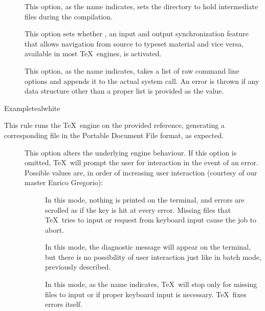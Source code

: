 \begin{description}
\begin{description}
\item[] This option, as the name indicates, sets the directory to hold intermediate files during the compilation.

\item[] This option sets whether , an input and output synchronization feature that allows navigation from source to typeset material and vice versa, available in most \TeX\ engines, is activated.

\item[] This option, as the name indicates, takes a list of raw command line options and appends it to the actual system call. An error is thrown if any data structure other than a proper list is provided as the value.
\end{description}

\begin{codebox}{Example}{teal}{\icnote}{white}
\end{codebox}

\item[\rulebox{luahbtex}]
This rule runs the  \TeX\ engine on the provided  reference, generating a corresponding file in the Portable Document File format, as expected.

\begin{description}
\item[] This option alters the underlying engine behaviour. If this option is omitted, \TeX\ will prompt the user for interaction in the event of an error. Possible values are, in order of increasing user interaction (courtesy of our master Enrico Gregorio):

\begin{description}
\item[] In this mode, nothing is printed on the terminal, and errors are scrolled as if the  key is hit at every error. Missing files that \TeX\ tries to input or request from keyboard input cause the job to abort.

\item[] In this mode, the diagnostic message will appear on the terminal, but there is no possibility of user interaction just like in batch mode, previously described.

\item[] In this mode, as the name indicates, \TeX\ will stop only for missing files to input or if proper keyboard input is necessary. \TeX\ fixes errors itself.


\end{description}
\end{description}
\end{description}
